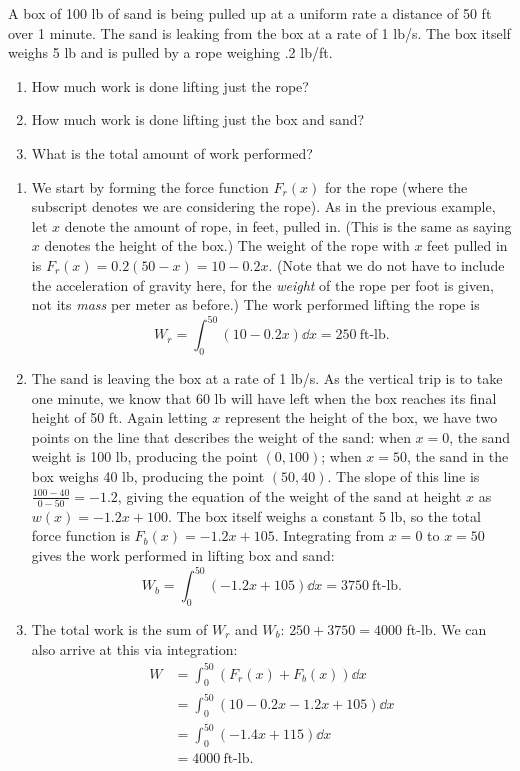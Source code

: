 \begin{example}\label{ex_work2}
A box of 100 lb of sand is being pulled up at a uniform rate a distance of 50 ft over 1 minute. The sand is leaking from the box at a rate of 1 lb/s. The box itself weighs 5 lb and is pulled by a rope weighing .2 lb/ft. 
\begin{enumerate}
	\item	How much work is done lifting just the rope?
	\item	How much work is done lifting just the box and sand?
	\item	What is the total amount of work performed?
\end{enumerate}
\solution
\begin{enumerate}
	\item	We start by forming the force function $F_r(x)$ for the rope (where the subscript denotes we are considering the rope). As in the previous example, let $x$ denote the amount of rope, in feet, pulled in. (This is the same as saying $x$ denotes the height of the box.) The weight of the rope with $x$ feet pulled in is $F_r(x) = 0.2(50-x) = 10-0.2x$. (Note that we do not have to include the acceleration of gravity here, for the \emph{weight} of the rope per foot is given, not its \emph{mass} per meter as before.) The work performed lifting the rope is 
	\[W_r = \int_0^{50} (10-0.2x)\dd x = 250\ \text{ft-lb}.\]
	
	\item	The sand is leaving the box at a rate of 1 lb/s. As the vertical trip is to take one minute, we know that 60 lb will have left when the box reaches its final height of 50 ft. Again letting $x$ represent the height of the box, we have two points on the line that describes the weight of the sand: when $x=0$, the sand weight is 100 lb, producing the point $(0,100)$; when $x=50$, the sand in the box weighs 40 lb, producing the point $(50,40)$. The slope of this line is $\frac{100-40}{0-50} = -1.2$, giving the equation of the weight of the sand at height $x$ as $w(x) = -1.2x+100$. The box itself weighs a constant 5 lb, so the total force function is $F_b(x) = -1.2x+105$. Integrating from $x=0$ to $x=50$ gives the work performed in lifting box and sand:
	\[W_b = \int_0^{50} (-1.2x+105)\dd x = 3750\ \text{ft-lb.}\]
	
	\item	The total work is the sum of $W_r$ and $W_b$: $250+3750=4000$ ft-lb. We can also arrive at this via integration:
	\begin{align*}
	W
	&= \int_0^{50} (F_r(x)+F_b(x))\dd x \\
	&= \int_0^{50} (10-0.2x-1.2x+105)\dd x \\
	&= \int_0^{50} (-1.4x+115) \dd x \\
	&= 4000 \ \text{ft-lb.}
	\end{align*}	
\end{enumerate}
\end{example}

